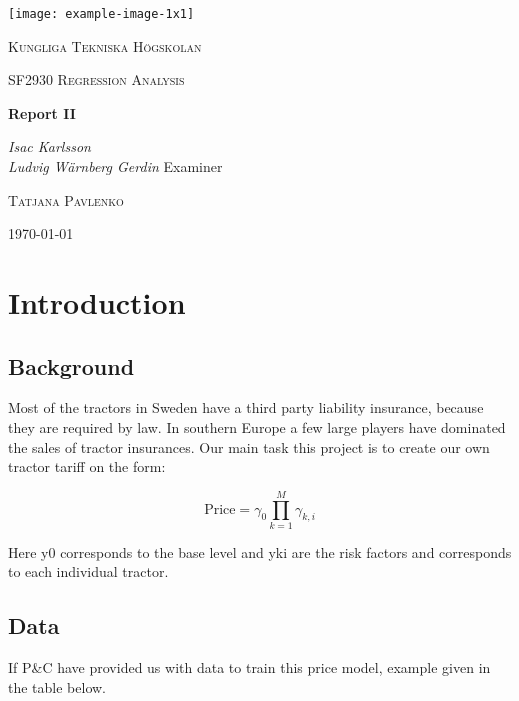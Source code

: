 \documentclass[11pt]{article}
\author{Ludde}
\date{\today}
\title{}
\begin{document}
\begin{titlepage}
\centering
\texttt{[image: example-image-1x1]}\par\vspace{1cm}
{\scshape\LARGE Kungliga Tekniska Högskolan \par}
\vspace{1cm}
{\scshape\Large SF2930 Regression Analysis \par}
\vspace{1.5cm}
{\huge\bfseries Report II \\  \par}
\vspace{2cm}
{\Large\itshape Isac Karlsson \\ Ludvig Wärnberg Gerdin}
\vfill
Examiner \par
\textsc{Tatjana Pavlenko}

\vfill

{\large \today\par}
\end{titlepage}

\newpage
\tableofcontents
\newpage

\section{Introduction}
\label{sec:org98daf89}
\subsection{Background}
\label{sec:orga14df41}
Most of the tractors in Sweden have a third party liability insurance, because they are required by law. 
In southern Europe a few large players have dominated the sales of tractor insurances. Our main task this
project is to create our own tractor tariff on the form:

\begin{equation}
  \text{Price} = \gamma_0 \prod_{k = 1}^M \gamma_{k,i}  
\end{equation}

Here y0 corresponds to the base level and yki are the risk factors and corresponds to each individual 
tractor. 

\subsection{Data}
\label{sec:org92878bd}

If P\&C have provided us with data to train this price model, example given in the table below.
\end{document}
